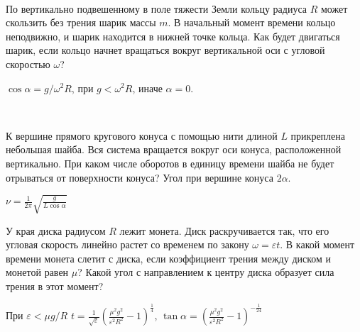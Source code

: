 \begin{ex}
\hspace{0pt} \\
\begin{minipage}{.65\textwidth}
По вертикально подвешенному в поле тяжести Земли кольцу радиуса $R$ может скользить без трения шарик массы $m$. 
В начальный момент времени кольцо неподвижно, и шарик находится в нижней точке кольца. 
Как будет двигаться шарик, если кольцо начнет вращаться вокруг вертикальной оси с угловой скоростью $\omega$?
\end{minipage}
\begin{minipage}{.35\textwidth}
\centering

\end{minipage}
\begin{ans}
$\cos \alpha = g/\omega^2 R$, при $g < \omega^2 R$, иначе $\alpha = 0$.
\end{ans}
\end{ex}

\begin{ex}
\hspace{0pt} \\
\begin{minipage}{.65\textwidth}
К вершине прямого кругового конуса с помощью нити длиной $L$ прикреплена небольшая шайба. Вся система вращается вокруг оси конуса, расположенной вертикально. При каком числе оборотов в единицу времени шайба не будет отрываться от поверхности конуса? Угол при вершине конуса $2\alpha$.
\end{minipage}
\begin{minipage}{.35\textwidth}
\centering

\end{minipage}
\begin{ans}
$\nu = \frac{1}{2\pi}\sqrt{\frac{g}{L \cos \alpha}}$
\end{ans}
\end{ex}

\begin{ex}
У края диска радиусом $R$ лежит монета. Диск раскручивается так, что его угловая скорость линейно растет со временем по закону $\omega = \varepsilon t$.  В какой момент времени монета слетит с диска, если коэффициент трения между диском и монетой равен $\mu$? Какой угол с направлением к центру диска образует сила трения в этот момент?
\begin{ans}
При $\varepsilon < \mu g /R$ $t=\frac{1}{\sqrt{\varepsilon}}\left( \frac{\mu^2 g^2}{\varepsilon^2 R^2} - 1 \right)^{\frac{1}{4}}$, $\tan \alpha = \left( \frac{\mu^2 g^2}{\varepsilon^2 R^2} - 1 \right)^{-\frac{1}{24}}$
\end{ans}
\end{ex}

